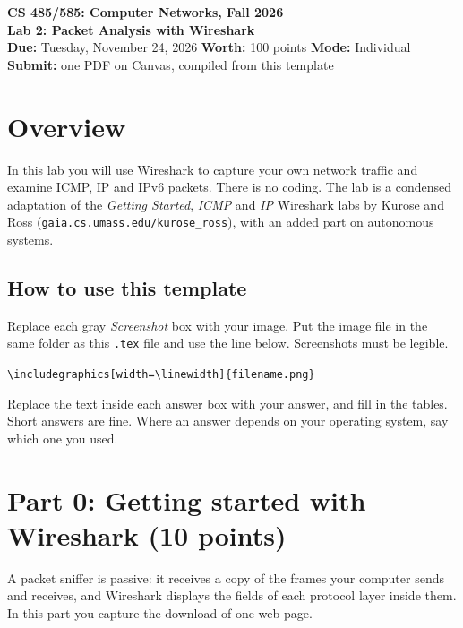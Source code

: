 \documentclass[11pt]{article}
\newcommand{\cmd}[1]{\texttt{#1}}
\begin{document}
\begin{center}
{\Large \textbf{CS 485/585: Computer Networks, Fall 2026}}\\[4pt]
{\large \textbf{Lab 2: Packet Analysis with Wireshark}}\\[8pt]
\textbf{Due:} Tuesday, November 24, 2026 \quad \textbf{Worth:} 100 points \quad \textbf{Mode:} Individual\\
\textbf{Submit:} one PDF on Canvas, compiled from this template
\end{center}

\vspace{2pt}

\section{Overview}

In this lab you will use Wireshark to capture your own network traffic and examine ICMP, IP and IPv6 packets. There is no coding. The lab is a condensed adaptation of the \textit{Getting Started}, \textit{ICMP} and \textit{IP} Wireshark labs by Kurose and Ross (\texttt{gaia.cs.umass.edu/kurose\_ross}), with an added part on autonomous systems.

\subsection*{How to use this template}

Replace each gray \textit{Screenshot} box with your image. Put the image file in the same folder as this \texttt{.tex} file and use the line below. Screenshots must be legible.
\begin{center}\cmd{\textbackslash includegraphics[width=\textbackslash linewidth]\{filename.png\}}\end{center}
Replace the text inside each answer box with your answer, and fill in the tables. Short answers are fine. Where an answer depends on your operating system, say which one you used.

\section{Part 0: Getting started with Wireshark (10 points)}

A packet sniffer is passive: it receives a copy of the frames your computer sends and receives, and Wireshark displays the fields of each protocol layer inside them. In this part you capture the download of one web page.
\end{document}
